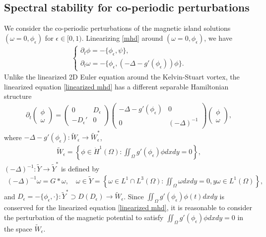 \documentclass[1 [leqno, 11pt]{amsart}
\numberwithin{equation}{section}
\let\ep=\epsilon
\begin{document}
\begin{CJK*}{GBK}{song}
\subsection{Spectral stability for co-periodic perturbations}
We consider the co-periodic perturbations of the magnetic island solutions $(\omega=0,\phi_{\ep})$ for $\ep\in[0,1)$.
Linearizing \eqref{mhd} around $(\omega=0,\phi_{\ep})$, we have
\begin{align}\label{linearized mhd}
\left\{ \begin{array}{lll} \partial_t \phi=-\{\phi_\ep,\psi\},\\
 \partial_t \omega=-\{\phi_{\ep},(-\Delta-g'(\phi_{\ep}))\phi\}.
 \end{array} \right.
\end{align}
Unlike the linearized  2D Euler equation around the Kelvin-Stuart vortex,
the linearized equation \eqref{linearized mhd} has a different separable Hamiltonian structure
\begin{align}\label{linearized mhd-sep-hamiltonian}
\partial_t \left( \begin{array}{c} \phi \\ \omega \end{array} \right) = \left( \begin{array}{cc} 0 & D_\ep \\ -D_{\ep}' & 0 \end{array} \right)\left( \begin{array}{cc}-\Delta-g'(\phi_{\ep}) & 0 \\ 0 & (-\Delta)^{-1} \end{array} \right) \left( \begin{array}{c} \phi \\ \omega \end{array} \right),
\end{align}
where  $-\Delta-g'(\phi_{\ep}):\tilde W_{\ep}\to\tilde W_{\ep}^*$,
\begin{align*}
\tilde W_{\ep}=\left\{ \phi\in \dot{H}^1(\Omega) :\iint_\Omega g'(\phi_\ep)\phi dxdy=0 \right\},
\end{align*}
 $(-\Delta)^{-1}:\tilde Y\to\tilde Y^*$ is defined by
\begin{align}\label{tilde Y-space}(-\Delta)^{-1}\omega=G\ast\omega,\quad\omega\in \tilde Y=\left\{\omega\in L^1\cap L^3 (\Omega):\iint_{\Omega}\omega dxdy=0,y\omega\in L^1(\Omega)\right\},
\end{align}
  and $D_\ep=-\{\phi_{\ep},\cdot\}:\tilde Y^*\supset D(D_\ep)\to\tilde W_{\ep}$.
 Since $\iint_{\Omega}g'(\phi_\ep)\phi(t) dxdy$ is conserved for the linearized equation \eqref{linearized mhd},  it is reasonable to consider the perturbation of the magnetic potential  to satisfy $\iint_\Omega g'(\phi_\ep)\phi dxdy=0$ in the space $\tilde W_{\ep}$.

\end{CJK*}
\end{document}
